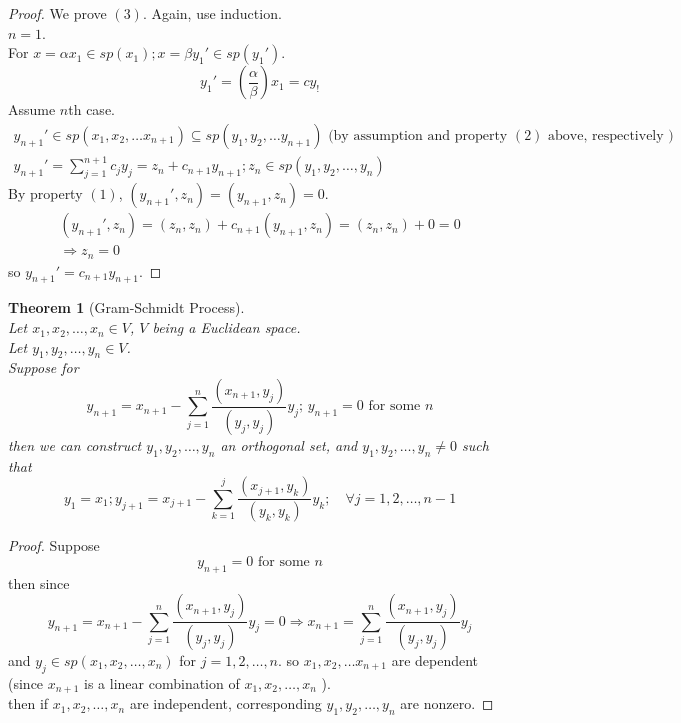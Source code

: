 \documentclass[twoside]{amsart}
\theoremstyle{plain}
\newtheorem{theorem}{Theorem}
\theoremstyle{definition}
\begin{document}
\begin{proof}
  We prove $(3)$.  Again, use induction.  \\
  $n=1$. \\
  For $x=\alpha x_1 \in sp(x_1); x = \beta y_1' \in sp(y_1') $.  
  \[
  y_1' = \left( \frac{\alpha}{\beta} \right)x_1 = c y_!
  \]
  Assume $n$th case.  \\
  \begin{gather*}
    y_{n+1}' \in sp(x_1,x_2, \dots x_{n+1} ) \subseteq sp(y_1,y_2, \dots y_{n+1} ) \text{ (by assumption and property $(2)$ above, respectively ) }\\
    y_{n+1}' = \sum_{j=1}^{n+1} c_j y_j = z_n + c_{n+1}y_{n+1}; z_n \in sp( y_1, y_2, \dots , y_n ) 
  \end{gather*}
  By property $(1)$, $(y_{n+1}', z_n) = (y_{n+1},z_n ) =0 $.  \\
  \begin{gather*}
    (y_{n+1}',z_n ) = (z_n,z_n) + c_{n+1}(y_{n+1}, z_n ) = (z_n, z_n) + 0 = 0 \\
    \Longrightarrow z_n = 0
  \end{gather*}
  so $y_{n+1}' = c_{n+1}y_{n+1}$.  
\end{proof}

\begin{theorem}[Gram-Schmidt Process]\label{T:Gram-Schmidt_Process} \quad \\
  Let $x_1,x_2, \dots , x_n \in V$, $V$ being a Euclidean space. \\
  Let $y_1,y_2, \dots , y_n \in V$.  \\
  Suppose for 
  \begin{equation*}
    y_{n+1} = x_{n+1} - \sum_{j=1}^n \frac{ (x_{n+1}, y_j ) }{ (y_j, y_j) } y_j ; \, y_{n+1} = 0 \text{ for some } n 
  \end{equation*}
  \phantom{Supp} then we can construct $y_1,y_2, \dots , y_n$ an orthogonal set, and $y_1, y_2, \dots, y_n \neq 0$ such that
  \begin{equation}
    y_1 = x_1; y_{j+1} = x_{j+1} - \sum_{k=1}^j \frac{ (x_{j+1}, y_k ) }{ (y_k, y_k) } y_k ;  \quad \forall j =1,2 , \dots , n-1
    \end{equation}
\end{theorem}
\begin{proof}
  Suppose
  \[
  y_{n+1} = 0 \text{ for some } n
  \]
  then since 
  \[
 y_{n+1} = x_{n+1} - \sum_{j=1}^n \frac{ (x_{n+1}, y_j ) }{ (y_j, y_j) } y_j = 0 \Longrightarrow x_{n+1} = \sum_{j=1}^n \frac{ (x_{n+1}, y_j ) }{ (y_j, y_j) } y_j 
  \]
  \phantom{Supp} and $y_j \in sp(x_1,x_2, \dots , x_n )$ for $j=1,2, \dots , n$.  
  \phantom{sup} so $x_1,x_2, \dots x_{n+1}$ are dependent (since $x_{n+1}$ is a linear combination of $x_1,x_2, \dots , x_n$ ).  \\
  then if $x_1,x_2, \dots , x_n$ are independent, corresponding $y_1,y_2, \dots , y_n $ are nonzero.  
\end{proof}
\end{document}
